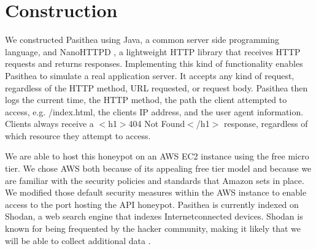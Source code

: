 
\section{Construction} \label{construction}

We constructed Pasithea using Java, a common server side programming language, and NanoHTTPD \cite{Nanohttpd}, a lightweight HTTP library that receives HTTP requests and returns responses.  Implementing this kind of functionality enables Pasithea to simulate a real application server. It accepts any kind of request, regardless of the HTTP method, URL requested, or request body. Pasithea then logs the current time, the HTTP method, the path the client attempted to access, e.g. /index.html, the clients IP address, and the user agent information. Clients always receive a $<$h1$>$404 Not Found$<$/h1$>$ response, regardless of which resource they attempt to access.

We are able to host this honeypot on an AWS EC2 instance using the free micro tier. We chose AWS both because of its appealing free tier model and because we are familiar with the security policies and standards that Amazon sets in place. We modified those default security measures within the AWS instance to enable access to the port hosting the API honeypot. Pasithea is currently indexed on Shodan, a web search engine that indexes Internetconnected devices. Shodan is known for being frequented by the hacker community, making it likely that we will be able to collect additional data \cite{unsavoryChar}.

